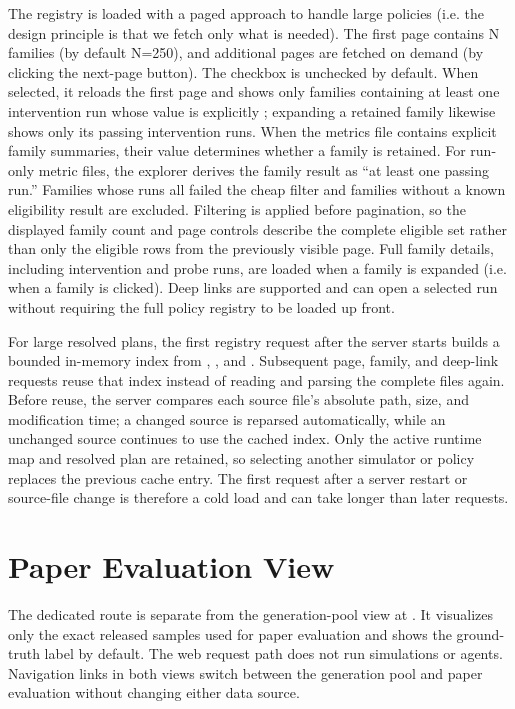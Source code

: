 \documentclass[11pt]{article}
\begin{document}
The registry is loaded with a paged approach to handle large policies (i.e. the design principle is that we fetch only what is needed).
The first page contains N families (by default N=250), and additional pages are fetched on demand (by clicking the next-page button).
The  checkbox is unchecked by default.
When selected, it reloads the first page and shows only families containing at least one intervention run whose  value is explicitly ; expanding a retained family likewise shows only its passing intervention runs.
When the metrics file contains explicit family summaries, their  value determines whether a family is retained.
For run-only metric files, the explorer derives the family result as ``at least one passing run.''
Families whose runs all failed the cheap filter and families without a known eligibility result are excluded.
Filtering is applied before pagination, so the displayed family count and page controls describe the complete eligible set rather than only the eligible rows from the previously visible page.
Full family details, including intervention and probe runs, are loaded when a family is expanded (i.e. when a family is clicked).
Deep links are supported and can open a selected run without requiring the full policy registry to be loaded up front.

For large resolved plans, the first registry request after the server starts builds a bounded in-memory index from , , and .
Subsequent page, family, and deep-link requests reuse that index instead of reading and parsing the complete files again.
Before reuse, the server compares each source file's absolute path, size, and modification time; a changed source is reparsed automatically, while an unchanged source continues to use the cached index.
Only the active runtime map and resolved plan are retained, so selecting another simulator or policy replaces the previous cache entry.
The first request after a server restart or source-file change is therefore a cold load and can take longer than later requests.

\section*{Paper Evaluation View}

The dedicated  route is separate from the generation-pool view at \code{/}.
It visualizes only the exact released samples used for paper evaluation and shows the ground-truth label by default.
The web request path does not run simulations or agents.
Navigation links in both views switch between the generation pool and paper evaluation without changing either data source.
\end{document}

